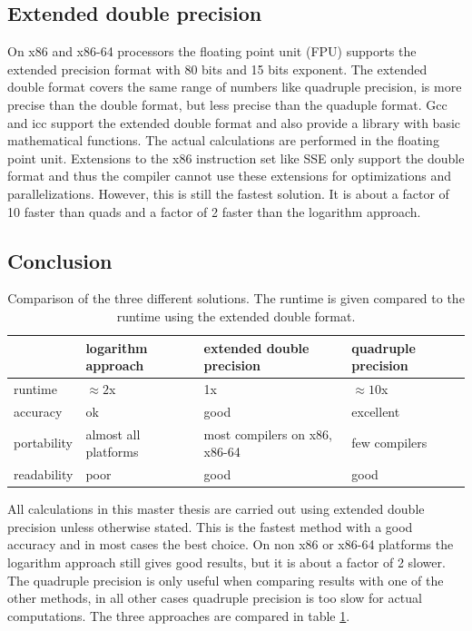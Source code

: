 \subsection{Extended double precision}

On x86 and x86-64 processors the floating point unit (FPU) supports the extended
precision format with 80 bits and 15 bits exponent. The extended double format
covers the same range of numbers like quadruple precision, is more precise than
the double format, but less precise than the quaduple format. Gcc and icc
support the extended double format and also provide a library with basic mathematical
functions. The actual calculations are performed in the floating point unit.
Extensions to the x86 instruction set like SSE only support the double
format and thus the compiler cannot use these extensions for optimizations and
parallelizations. However, this is still the fastest solution. It is about a
factor of 10 faster than quads and a factor of 2 faster than the logarithm
approach.


\subsection{Conclusion}

\begin{table}
\begin{center}
\begin{tabular}{|l|l|l|l|}
\hline
            & logarithm approach   & extended double precision     & quadruple precision \\
\hline
runtime     & $\approx2$x          & 1x                            & $\approx10$x \\
\hline
accuracy    & ok                   & good                          & excellent \\
\hline
portability & almost all platforms & most compilers on x86, x86-64 & few compilers \\
\hline
readability & poor                 & good                          & good \\
\hline
\end{tabular}
\caption{Comparison of the three different solutions. The runtime is
given compared to the runtime using the extended double format.}
\label{tab:numerics_melements_conclusion}
\end{center}
\end{table}

All calculations in this master thesis are carried out using extended double precision
unless otherwise stated. This is the fastest method with a good accuracy and in
most cases the best choice. On non x86 or x86-64 platforms the logarithm
approach still gives good results, but it is about a factor of 2 slower. The
quadruple precision is only useful when comparing results with one of the other
methods, in all other cases quadruple precision is too slow for actual
computations. The three approaches are compared in table
\ref{tab:numerics_melements_conclusion}.


